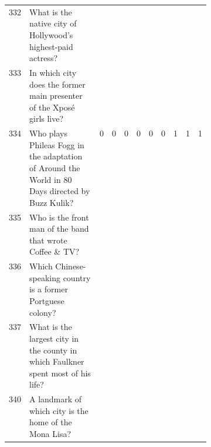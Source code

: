 \begin{longtable}{@{}lp{0.4\linewidth}lllllllll@{}}
332      & What is the native city of Hollywood's highest-paid actress?                                                & \cellcolor[HTML]{BBDAFF}    & \cellcolor[HTML]{BBDAFF}     & \cellcolor[HTML]{BBDAFF}     & \cellcolor[HTML]{BBDAFF}  & \cellcolor[HTML]{BBDAFF}  & \cellcolor[HTML]{BBDAFF}  & \cellcolor[HTML]{BBDAFF} & \cellcolor[HTML]{BBDAFF} & \cellcolor[HTML]{BBDAFF} \\
333      & In which city does the former main presenter of the Xposé girls live?                                       & \cellcolor[HTML]{FE0000}   & \cellcolor[HTML]{FE0000}    & \cellcolor[HTML]{FE0000}    & \cellcolor[HTML]{FE0000} & \cellcolor[HTML]{FE0000} & \cellcolor[HTML]{FE0000} & \cellcolor[HTML]{FE0000} & \cellcolor[HTML]{FE0000} & \cellcolor[HTML]{FE0000} \\
334      & Who plays Phileas Fogg in the adaptation of Around the World in 80 Days directed by Buzz Kulik?             & \cellcolor[HTML]{FFFE65}0   & \cellcolor[HTML]{FFFE65}0    & \cellcolor[HTML]{FFFE65}0    & \cellcolor[HTML]{FFFE65}0 & \cellcolor[HTML]{FFFE65}0 & \cellcolor[HTML]{FFFE65}0 & 1                        & 1                        & 1                        \\
335      & Who is the front man of the band that wrote Coffee \& TV?                                                   & \cellcolor[HTML]{FE0000}   & \cellcolor[HTML]{FE0000}    & \cellcolor[HTML]{FE0000}    & \cellcolor[HTML]{FE0000} & \cellcolor[HTML]{FE0000} & \cellcolor[HTML]{FE0000} & \cellcolor[HTML]{FE0000} & \cellcolor[HTML]{FE0000} & \cellcolor[HTML]{FE0000} \\
336      & Which Chinese-speaking country is a former Portguese colony?                                                & \cellcolor[HTML]{BBDAFF}    & \cellcolor[HTML]{BBDAFF}     & \cellcolor[HTML]{BBDAFF}     & \cellcolor[HTML]{BBDAFF}  & \cellcolor[HTML]{BBDAFF}  & \cellcolor[HTML]{BBDAFF}  & \cellcolor[HTML]{BBDAFF} & \cellcolor[HTML]{BBDAFF} & \cellcolor[HTML]{BBDAFF} \\
337      & What is the largest city in the county in which Faulkner spent most of his life?                            & \cellcolor[HTML]{BBDAFF}    & \cellcolor[HTML]{BBDAFF}     & \cellcolor[HTML]{BBDAFF}     & \cellcolor[HTML]{BBDAFF}  & \cellcolor[HTML]{BBDAFF}  & \cellcolor[HTML]{BBDAFF}  & \cellcolor[HTML]{BBDAFF} & \cellcolor[HTML]{BBDAFF} & \cellcolor[HTML]{BBDAFF} \\
340      & A landmark of which city is the home of the Mona Lisa?                                                      & \cellcolor[HTML]{FE0000}   & \cellcolor[HTML]{FE0000}    & \cellcolor[HTML]{FE0000}    & \cellcolor[HTML]{FE0000} & \cellcolor[HTML]{FE0000} & \cellcolor[HTML]{FE0000} & \cellcolor[HTML]{FE0000} & \cellcolor[HTML]{FE0000} & \cellcolor[HTML]{FE0000} \\

\end{longtable}
